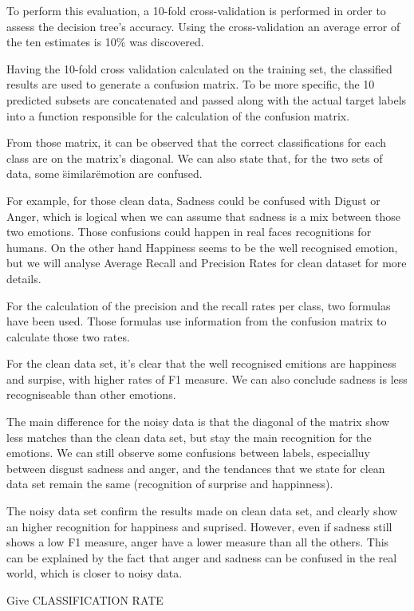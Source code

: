 To perform this evaluation, a 10-fold cross-validation is performed in order to assess the decision tree’s accuracy.
Using the cross-validation an average error of the ten estimates is 10\% was discovered.

Having the 10-fold cross validation calculated on the training set, the classified results
are used to generate a confusion matrix.
To be more specific, the 10 predicted subsets are concatenated
and passed along with the actual target labels into a function responsible for the calculation of the confusion matrix.

From those matrix, it can be observed that the correct classifications for each class are on the matrix’s diagonal.
We can also state that, for the two sets of data, some \"similar\" emotion are confused.



For example, for those clean data, Sadness could be confused with Digust or Anger, which is logical when we can assume that sadness is a mix between those two emotions. 
Those confusions could happen in real faces recognitions for humans.
On the other hand Happiness seems to be the well recognised emotion, but we will
analyse Average Recall and Precision Rates for clean dataset for more details. 




For the calculation of the precision and the recall rates per class, two formulas have been used.
Those formulas use information from the confusion matrix to calculate those two rates.

For the clean data set, it's clear that the well recognised emitions are happiness and surpise, with higher rates of F1 measure. 
We can also conclude sadness is less recogniseable than other emotions.



The main difference for the noisy data is that the diagonal of the matrix show less matches than the clean data set, but stay the main recognition for the emotions.
We can still observe some confusions between labels, especialluy between disgust sadness and anger, and the tendances that we state for clean data set remain the same (recognition of surprise and happinness).




The noisy data set confirm the results made on clean data set, and clearly show an higher recognition for happiness and suprised. However, even if sadness still shows a low F1 measure, anger have a lower measure than all the others. This can be explained by the fact that anger and sadness can be confused in the real world, which is closer to noisy data. 



Give CLASSIFICATION RATE
